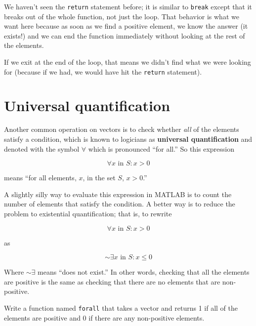 \documentclass{book}
\begin{document}
We haven't seen the {\tt return} statement before; it is similar
to {\tt break} except that it breaks out of the whole function, not
just the loop.  That behavior is what we want here because as soon
as we find a positive element, we know the answer (it exists!) and
we can end the function immediately without looking at the rest
of the elements.

If we exit at the end of the loop, that means we didn't find what
we were looking for (because if we had, we would have hit the
{\tt return} statement).



\section{Universal quantification}

Another common operation on vectors is to check whether {\em all}
of the elements satisfy a condition, which is known to
logicians as {\bf universal quantification} and denoted with
the symbol $\forall$ which is pronounced ``for all.''  So this
expression

\begin{equation}
\forall x \mbox{~in~} S: x>0
\end{equation}

means ``for all elements, $x$, in the set $S$, $x>0$.''

A slightly silly way to evaluate this expression in MATLAB is to
count the number of elements that satisfy the condition.
A better way is to reduce the problem to
existential quantification; that is, to rewrite

\begin{equation}
\forall x \mbox{~in~} S: x>0
\end{equation}

as

\begin{equation}
\sim \exists x \mbox{~in~} S: x \le 0
\end{equation}

Where $\sim \exists$ means ``does not exist.''
In other words, checking that all the elements are positive is
the same as checking that there are no elements
that are non-positive.

\begin{ex}
Write a function named {\tt forall} that
takes a vector and returns 1 if all of the elements are positive
and 0 if there are any non-positive elements.
\end{ex}
\end{document}
